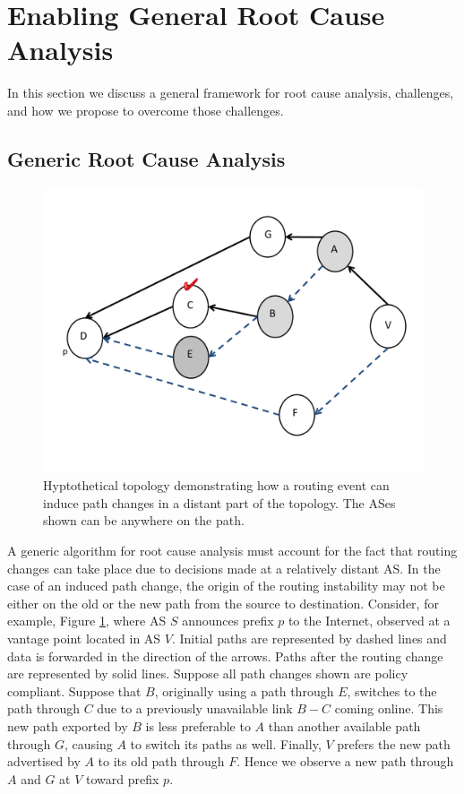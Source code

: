 \section{Enabling General Root Cause Analysis}
\label{sec:general}

In this section we discuss a general framework for root cause analysis,
challenges, and how we propose to overcome those challenges.

\subsection{Generic Root Cause Analysis}

\begin{figure}[!htbp]
\centering\includegraphics[width=\columnwidth]{figs/general-recur.pdf}
\caption{Hyptothetical topology demonstrating how a routing event 
can induce path changes in a distant part of the topology. 
The ASes shown can be anywhere on the path. }
\label{fig:recur}
\end{figure}


A generic algorithm for root cause analysis must account for the fact that 
routing changes can take place due to decisions made at a relatively distant AS.
In the case of an induced path change, the origin of the routing instability may not be either
on the old or the new path from the source to destination.
Consider, for example, Figure \ref{fig:recur}, where AS $S$ announces prefix $p$
to the Internet, observed at a vantage point located in AS $V$.
Initial paths are represented by dashed lines and data is forwarded
in the direction of the arrows. Paths after the routing change are represented by
solid lines.  Suppose all path changes
shown are policy compliant. 
Suppose that $B$, originally using a path
through $E$, switches to the path through $C$ due to a previously unavailable link $B-C$ coming online. 
This new path exported by $B$ is less 
preferable to $A$ than another available path through $G$, causing $A$ to switch 
its paths as well. Finally, $V$ prefers the new path advertised by $A$ to its old
path through $F$. Hence we observe a new path through $A$ and $G$ at $V$ toward prefix $p$. 

